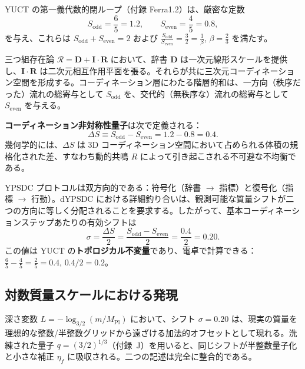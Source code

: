 \documentclass[11pt,a4paper]{article}
\theoremstyle{remark}
\begin{document}
	YUCT の第一義代数的閉ループ（付録 Ferra1.2）は、厳密な定数
	\begin{equation}
		S_{\mathrm{odd}} = \frac{6}{5} = 1.2,\qquad S_{\mathrm{even}} = \frac{4}{5} = 0.8,
	\end{equation}
	を与え、これらは \(\displaystyle S_{\mathrm{odd}}+S_{\mathrm{even}}=2\) および \(\displaystyle \frac{S_{\mathrm{odd}}}{S_{\mathrm{even}}}=\frac{3}{2}=\frac{1}{\beta}\), \(\beta=\frac{2}{3}\) を満たす。
	
	三つ組存在論 \(\mathcal{R}=\mathbf{D}+\mathbf{I}\!\cdot\!\mathbf{R}\) において、辞書 \(\mathbf{D}\) は一次元線形スケールを提供し、\(\mathbf{I}\!\cdot\!\mathbf{R}\) は二次元相互作用平面を張る。それらが共に三次元コーディネーション空間を形成する。コーディネーション層にわたる階層的和は、一方向（秩序だった）流れの総寄与として \(S_{\mathrm{odd}}\) を、交代的（無秩序な）流れの総寄与として \(S_{\mathrm{even}}\) を与える。
	
	\textbf{コーディネーション非対称性量子}は次で定義される：
	\begin{equation}
		\Delta S \equiv S_{\mathrm{odd}} - S_{\mathrm{even}} = 1.2 - 0.8 = 0.4.
		\label{eq:DS}
	\end{equation}
	幾何学的には、\(\Delta S\) は 3D コーディネーション空間において占められる体積の規格化された差、すなわち動的共鳴 \(R\) によって引き起こされる不可避な不均衡である。
	
	YPSDC プロトコルは双方向的である：符号化（辞書 \(\to\) 指標）と復号化（指標 \(\to\) 行動）。dYPSDC における詳細釣り合いは、観測可能な質量シフトが二つの方向に等しく分配されることを要求する。したがって、基本コーディネーションステップあたりの有効シフトは
	\begin{equation}
		\boxed{\sigma = \frac{\Delta S}{2} = \frac{S_{\mathrm{odd}} - S_{\mathrm{even}}}{2} = \frac{0.4}{2} = 0.20.}
		\label{eq:sigma}
	\end{equation}
	この値は YUCT の\textbf{トポロジカル不変量}であり、電卓で計算できる：\(\frac{6}{5} - \frac{4}{5} = \frac{2}{5} = 0.4\), \(0.4/2 = 0.2\)。
	
	\subsection{対数質量スケールにおける発現}
	
	深さ変数 \(L = -\log_{3/2}(m/M_{\mathrm{Pl}})\) において、シフト \(\sigma = 0.20\) は、現実の質量を理想的な整数/半整数グリッドから遠ざける加法的オフセットとして現れる。洗練された量子 \(q = (3/2)^{1/3}\)（付録~J）を用いると、同じシフトが半整数量子化と小さな補正 \(\eta_f\) に吸収される。二つの記述は完全に整合的である。
	
\end{document}

